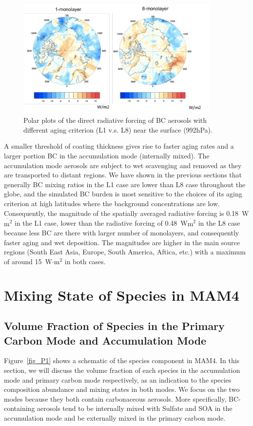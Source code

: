 \documentclass[12pt, fullpage]{uiucthesis2009}
\begin{document}
	\begin{figure}[h] 
		\begin{center}
			\includegraphics[width = 0.9\textwidth]{Figure22}
			\caption[Polar plots of the direct radiative forcing of BC aerosols with different aging criterion (L1 v.s. L8) near the surface (992hPa)]{\label{fig_P22} Polar plots of the direct radiative forcing of BC aerosols with different aging criterion (L1 v.s. L8) near the surface (992hPa).}
		\end{center}
	\end{figure}
	A smaller threshold of coating thickness gives rise to faster aging rates and a larger portion BC in the accumulation mode (internally mixed). The accumulation mode aerosols are subject to wet scavenging and removed as they are transported to distant regions. We have shown in the previous sections that generally BC mixing ratios in the L1 case are lower than L8 case throughout the globe, and the simulated BC burden is most sensitive to the choices of its aging criterion at high latitudes where the background concentrations are low. Consequently, the magnitude of the spatially averaged radiative forcing is 0.18~W$\dot{\text{m}^2}$ in the L1 case, lower than the radiative forcing of 0.48~W$\dot{\text{m}^2}$ in the L8 case because less BC are there with larger number of monolayers, and consequently faster aging and wet deposition. The magnitudes are higher in the main source regions (South East Asia, Europe, South America, Aftica, etc.) with a maximum of around 15~W$\cdot{\text{m}^2}$ in both cases. 
	
	\section{Mixing State of Species in MAM4}
	\subsection{Volume Fraction of Species in the Primary Carbon Mode and Accumulation Mode}
	Figure~\ref{fig_P1} shows a schematic of the species component in MAM4. In this section, we will discuss the volume fraction of each species in the accumulation mode and primary carbon mode respectively, as an indication to the species composition abundance and mixing states in both modes. We focus on the two modes because they both contain carbonaceous aerosols. More specifically, BC-containing aerosols tend to be internally mixed with Sulfate and SOA in the accumulation mode and be externally mixed in the primary carbon mode.
	
\end{document}
